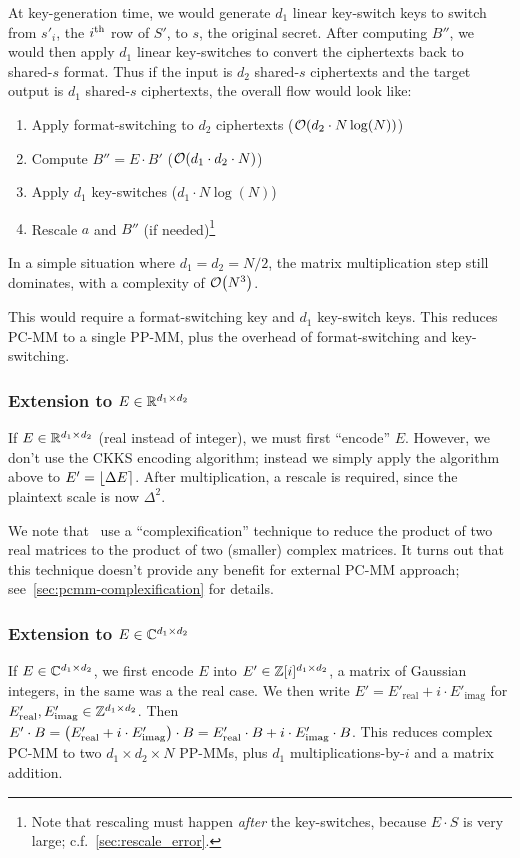 \documentclass[../fheimpl.tex]{subfiles}
\begin{document}
At key-generation time, we would generate $d_1$ linear key-switch keys to switch from $s'_i$, the $i\th$ row of $S'$, to $s$, the original secret. After computing $B''$, we would then apply $d_1$ linear key-switches to convert the ciphertexts back to shared-$s$ format. Thus if the input is $d_2$ shared-$s$ ciphertexts and the target output is $d_1$ shared-$s$ ciphertexts, the overall flow would look like:
\begin{enumerate}
	\item Apply format-switching to $d_2$ ciphertexts ($\mathcal{O}\parens*{d_2\cdot N\log(N)}$)
	\item Compute $B''=E\cdot B'$ ($\mathcal{O}\parens*{d_1\cdot d_2\cdot N}$)
	\item Apply $d_1$ key-switches ($d_1\cdot N\log(N)$)
	\item Rescale $a$ and $B''$ (if needed)\footnote{Note that rescaling must happen \emph{after} the key-switches, because $E\cdot S$ is very large; c.f.~\cref{sec:rescale_error}.}
\end{enumerate}
In a simple situation where $d_1=d_2=N/2$, the matrix multiplication step still dominates, with a complexity of $\mathcal{O}\parens*{N^3}$.

This would require a format-switching key and $d_1$ key-switch keys. 
This reduces PC-MM to a single PP-MM, plus the overhead of format-switching and key-switching.

\subsubsection{Extension to $E\in\R^{d_1\times d_2}$}
If $E\in\R^{d_1\times d_2}$ (real instead of integer), we must first ``encode'' $E$. However, we don't use the CKKS encoding algorithm; instead we simply apply the algorithm above to $E' = \round*{\Delta E}$. After multiplication, a rescale is required, since the plaintext scale is now $\Delta^2$.

We note that~\cite{KHBC+21, HPCC+21, 10.5555/3618408.3619194} use a ``complexification'' technique to reduce the product of two real matrices to the product of two (smaller) complex matrices. It turns out that this technique doesn't provide any benefit for external PC-MM approach; see~\cref{sec:pcmm-complexification} for details.

\subsubsection{Extension to $E\in\C^{d_1\times d_2}$}
\label{sec:pcmm-complex}
If $E\in\C^{d_1\times d_2}$, we first encode $E$ into $E'\in\Z[i]^{d_1\times d_2}$, a matrix of Gaussian integers, in the same was a the real case. We then write $E'=E'_\mathrm{real}+i\cdot E'_\mathrm{imag}$ for $E'_\mathrm{real}, E'_\mathrm{imag}\in\Z^{d_1\times d_2}$. Then $E'\cdot B = \parens*{E'_\mathrm{real}+i\cdot E'_\mathrm{imag}}\cdot B = E'_\mathrm{real}\cdot B + i\cdot E'_\mathrm{imag}\cdot B$. This reduces complex PC-MM to two $d_1\times d_2\times N$ PP-MMs, plus $d_1$ multiplications-by-$i$ and a matrix addition.
\end{document}
